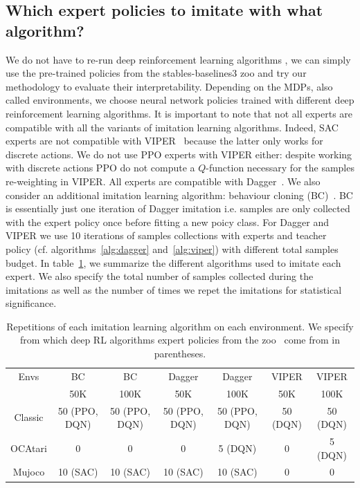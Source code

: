 \subsection{Which expert policies to imitate with what algorithm?}
We do not have to re-run deep reinforcement learning algorithms \cite{dqn,ppo,deep-rl-relu1}, we can simply use the pre-trained policies from the stables-baselines3 zoo \cite{zoo} and try our methodology to evaluate their interpretability.
Depending on the MDPs, also called environments, we choose neural network policies trained with different deep reinforcement learning algorithms.
It is important to note that not all experts are compatible with all the variants of imitation learning algorithms.
Indeed, SAC experts \cite{deep-rl-relu1} are not compatible with VIPER~\cite{viper} because the latter only works for discrete actions.
We do not use PPO experts with VIPER either: despite working with discrete actions PPO do not compute a $Q$-function necessary for the samples re-weighting in VIPER.
All experts are compatible with Dagger~\cite{dagger}.
We also consider an additional imitation learning algorithm: behaviour cloning (BC)~\cite{behavior-cloning}.
BC is essentially just one iteration of Dagger imitation i.e. samples are only collected with the expert policy once before fitting a new poicy class.
For Dagger and VIPER we use 10 iterations of samples collections with experts and teacher policy (cf. algorithms~\ref{alg:dagger} and~\ref{alg:viper}) with different total samples budget.
In table~\ref{tab:repet-distill}, we summarize the different algorithms used to imitate each expert.
We also specify the total number of samples collected during the imitations as well as the number of times we repet the imitations for statistical significance.

\begin{table}
  \centering
  \footnotesize
  \begin{tabular}{c|cccccc}
  \toprule
  Envs & BC & BC & Dagger & Dagger & VIPER & VIPER\\
   & 50K & 100K & 50K & 100K & 50K & 100K\\
  \midrule
  Classic& 50 (PPO, DQN)& 50 (PPO, DQN)& 50 (PPO, DQN)& 50 (PPO, DQN)&  50 (DQN) & 50 (DQN)\\
  OCAtari& 0 & 0 & 0 & 5 (DQN)&  0 & 5 (DQN)\\
  Mujoco& 10 (SAC)& 10 (SAC)& 10 (SAC)& 10 (SAC)&  0 & 0\\
  \bottomrule
  \end{tabular}
  \caption{Repetitions of each imitation learning algorithm on each environment. We specify from which deep RL algorithms expert policies from the zoo~\cite{zoo} come from in parentheses.}
  \label{tab:repet-distill}
\end{table}

